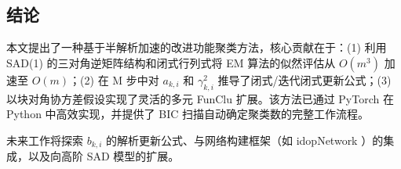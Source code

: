 \documentclass[12pt,a4paper]{article}
\begin{document}
\subsection{结论}

本文提出了一种基于半解析加速的改进功能聚类方法，核心贡献在于：(1) 利用 SAD(1) 的三对角逆矩阵结构和闭式行列式将 EM 算法的似然评估从 $O(m^3)$ 加速至 $O(m)$；(2) 在 M 步中对 $a_{k,i}$ 和 $\gamma_{k,i}^2$ 推导了闭式/迭代闭式更新公式；(3) 以块对角协方差假设实现了灵活的多元 FunClu 扩展。该方法已通过 PyTorch 在 Python 中高效实现，并提供了 BIC 扫描自动确定聚类数的完整工作流程。

未来工作将探索 $b_{k,i}$ 的解析更新公式、与网络构建框架（如 idopNetwork \cite{dong2023idopnetwork}）的集成，以及向高阶 SAD 模型的扩展。

\end{document}
